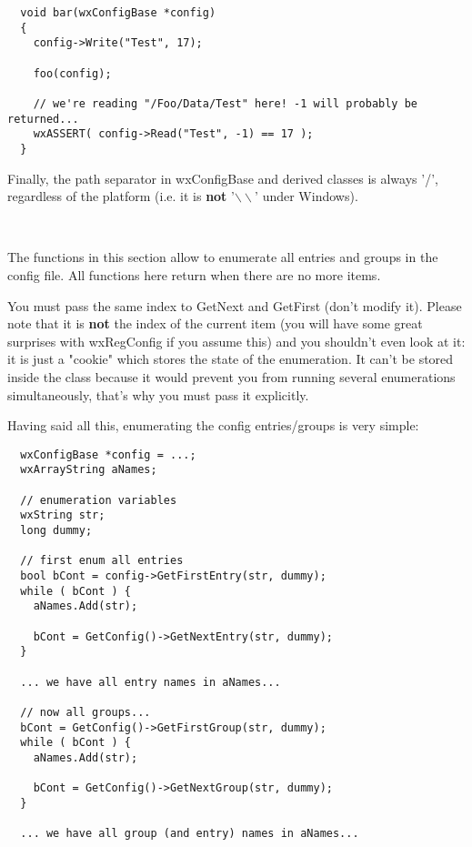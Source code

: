 \begin{verbatim}
  void bar(wxConfigBase *config)
  {
    config->Write("Test", 17);

    foo(config);

    // we're reading "/Foo/Data/Test" here! -1 will probably be returned...
    wxASSERT( config->Read("Test", -1) == 17 );
  }
\end{verbatim}

Finally, the path separator in wxConfigBase and derived classes is always '/',
regardless of the platform (i.e. it is {\bf not} '$\backslash\backslash$' under Windows).

\\


\label{configenumeration}

The functions in this section allow to enumerate all entries and groups in the
config file. All functions here return \false when there are no more items.

You must pass the same index to GetNext and GetFirst (don't modify it).
Please note that it is {\bf not} the index of the current item (you will have
some great surprises with wxRegConfig if you assume this) and you shouldn't
even look at it: it is just a "cookie" which stores the state of the
enumeration. It can't be stored inside the class because it would prevent you
from running several enumerations simultaneously, that's why you must pass it
explicitly.

Having said all this, enumerating the config entries/groups is very simple:

\begin{verbatim}
  wxConfigBase *config = ...;
  wxArrayString aNames;

  // enumeration variables
  wxString str;
  long dummy;

  // first enum all entries
  bool bCont = config->GetFirstEntry(str, dummy);
  while ( bCont ) {
    aNames.Add(str);

    bCont = GetConfig()->GetNextEntry(str, dummy);
  }

  ... we have all entry names in aNames...

  // now all groups...
  bCont = GetConfig()->GetFirstGroup(str, dummy);
  while ( bCont ) {
    aNames.Add(str);

    bCont = GetConfig()->GetNextGroup(str, dummy);
  }

  ... we have all group (and entry) names in aNames...

\end{verbatim}


